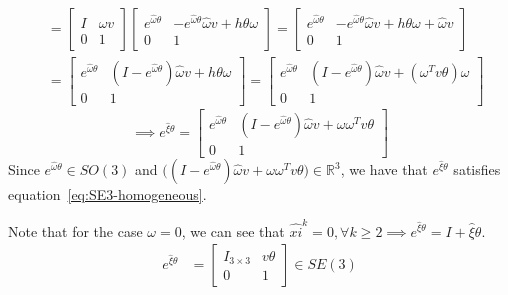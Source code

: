 \begin{align*}
      \\ & =
      \begin{bmatrix}
            I & \hat \omega v \\
            0 & 1
      \end{bmatrix}
      \begin{bmatrix}
            e^{\hat \omega \theta}
              &
            -e^{\hat \omega \theta} \hat \omega v + h \theta \omega
            \\
            0 & 1
      \end{bmatrix}
      =
      \begin{bmatrix}
            e^{\hat \omega \theta}
              &
            -e^{\hat \omega \theta} \hat \omega v + h \theta \omega + \hat \omega v
            \\
            0 & 1
      \end{bmatrix}
      \\ & =
      \begin{bmatrix}
            e^{\hat \omega \theta}
              &
            (I - e^{\hat \omega \theta}) \hat \omega v + h \theta \omega
            \\
            0 & 1
      \end{bmatrix}
      =
      \begin{bmatrix}
            e^{\hat \omega \theta}
              &
            (I - e^{\hat \omega \theta}) \hat \omega v + (\omega^T v \theta) \omega
            \\
            0 & 1
      \end{bmatrix}
\end{align*}
\begin{equation}\label{eq:SE3-exponential}
      \implies
      e^{\hat{\xi} \theta}
      =
      \begin{bmatrix}
            e^{\hat \omega \theta}
              &
            (I - e^{\hat \omega \theta}) \hat \omega v + \omega \omega^T v \theta
            \\
            0 & 1
      \end{bmatrix}
\end{equation}
Since \( e^{\hat \omega \theta} \in SO(3) \) and \( \Big( (I - e^{\hat \omega \theta}) \hat \omega v + \omega \omega^T v \theta \Big) \in \mathbb{R}^3 \), we have that \( e^{\hat{\xi} \theta} \) satisfies equation~\eqref{eq:SE3-homogeneous}.

Note that for the case \( \omega = 0 \), we can see that \( \hat{xi}^k = 0, \forall k \geq 2 \implies e^{\hat{\xi} \theta} = I + \hat{\xi} \theta \).
\begin{align*}
      e^{\hat{\xi} \theta}
       & =
      \begin{bmatrix}
            I_{3\times 3} & v \theta \\
            0             & 1
      \end{bmatrix}
      \in
      SE(3)
\end{align*}

